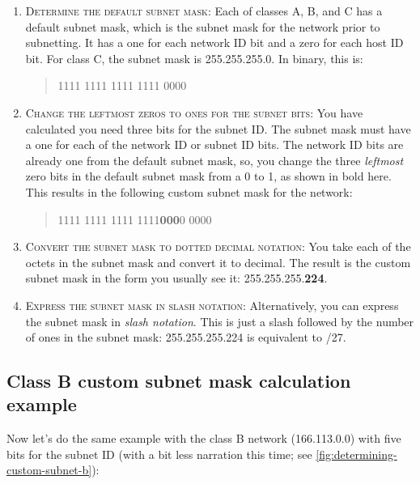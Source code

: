 \begin{enumerate}
   \item
      \textsc{Determine the default subnet mask}:
      Each of classes A, B, and C has a default subnet mask, which is the subnet mask for the network prior to subnetting.
      It has a one for each network ID bit and a zero for each host ID bit.
      For class C, the subnet mask is 255.255.255.0. In binary, this is:
      \begin{quote}
         1111 1111 1111 1111 0000
      \end{quote}

   \item
      \textsc{Change the leftmost zeros to ones for the subnet bits}:
      You have calculated you need three bits for the subnet ID.
      The subnet mask must have a one for each of the network ID or subnet ID bits.
      The network ID bits are already one from the default subnet mask, so,
      you change the three \emph{leftmost} zero bits in the default subnet mask from a 0 to 1, as shown in bold here.
      This results in the following custom subnet mask for the network:
      \begin{quote}
      1111 1111 1111 1111\quad \textbf{000}0 0000
      \end{quote}
      
   \item
      \textsc{Convert the subnet mask to dotted decimal notation}:
      You take each of the octets in the subnet mask and convert it to decimal.
      The result is the custom subnet mask in the form you usually see it: 255.255.255.\textbf{224}.

   \item
      \textsc{Express the subnet mask in slash notation}:
      Alternatively, you can express the subnet mask in \emph{slash notation}.
      This is just a slash followed by the number of ones in the subnet mask: 255.255.255.224 is equivalent to /27.
\end{enumerate}


\subsection{Class B custom subnet mask calculation example}

Now let's do the same example with the class B network (166.113.0.0)
with five bits for the subnet ID (with a bit less narration this time; see \cref{fig:determining-custom-subnet-b}):

